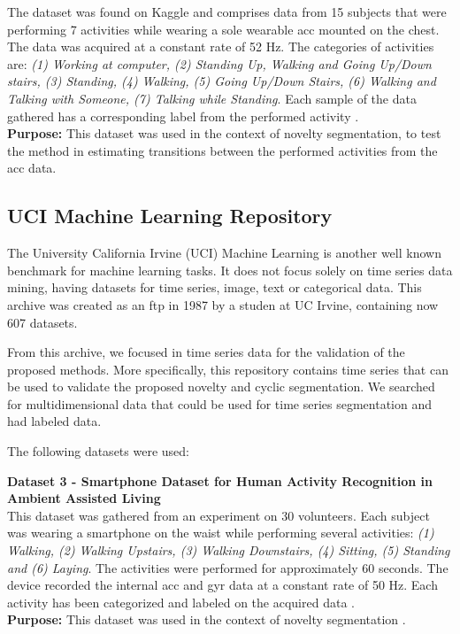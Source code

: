 The dataset was found on Kaggle and comprises data from 15 subjects that were performing 7 activities while wearing a sole wearable \gls{acc} mounted on the chest. The data was acquired at a constant rate of 52 Hz. The categories of activities are: \textit{(1) Working at computer, (2) Standing Up, Walking and Going Up/Down stairs, (3) Standing, (4) Walking, (5) Going Up/Down Stairs, (6) Walking and Talking with Someone, (7) Talking while Standing}. Each sample of the data gathered has a corresponding label from the performed activity \cite{dataset1}.\\
\textbf{Purpose:} This dataset was used in the context of novelty segmentation, to test the method in estimating transitions between the performed activities from the \gls{acc} data. 
 
 
\subsection{UCI Machine Learning Repository}
\label{subsec:uci}

The University California Irvine (UCI) Machine Learning is another well known benchmark for machine learning tasks. It does not focus solely on time series data mining, having datasets for time series, image, text or categorical data. This archive was created as an ftp in 1987 by a studen at UC Irvine, containing now 607 datasets. 
\par
From this archive, we focused in time series data for the validation of the proposed methods. More specifically, this repository contains time series that can be used to validate the proposed novelty and cyclic segmentation. We searched for multidimensional data that could be used for time series segmentation and had labeled data.
\par
The following datasets were used:

\textbf{Dataset 3 - Smartphone Dataset for Human Activity Recognition in Ambient Assisted Living}\\

This dataset was gathered from an experiment on 30 volunteers. Each subject was wearing a smartphone on the waist while performing several activities: \textit{(1) Walking, (2) Walking Upstairs, (3) Walking Downstairs, (4) Sitting, (5) Standing and (6) Laying}. The activities were performed for approximately 60 seconds. The device recorded the internal \gls{acc} and \gls{gyr} data at a constant rate of 50 Hz. Each activity has been categorized and labeled on the acquired data \cite{dataset2, dataset2_2}.\\
\textbf{Purpose:} This dataset was used in the context of novelty segmentation \cite{dataset2, dataset2_2}.


